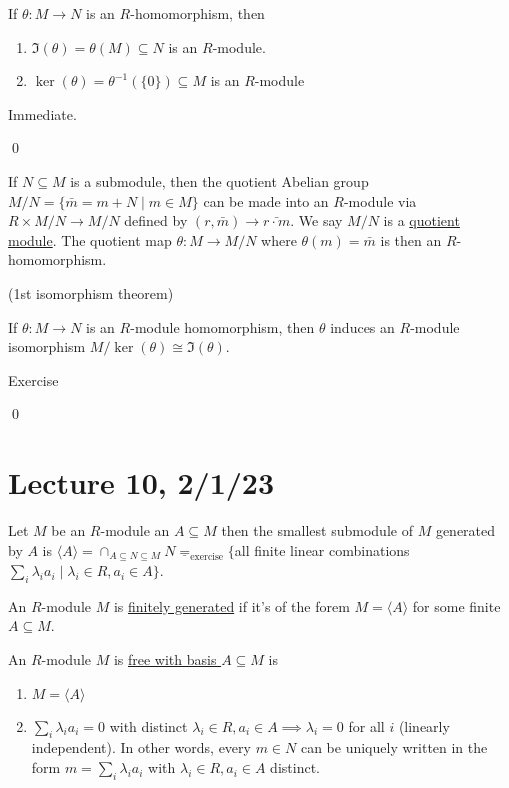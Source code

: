 \documentclass[x11names,reqno,14pt]{extarticle}
\begin{document}
\prop 

If $\theta:M\to N$ is an $R$-homomorphism, then 

\begin{enumerate}

\item $\Im(\theta) = \theta(M)\subseteq N$ is an $R$-module. 

\item $\ker(\theta) = \theta^{-1}(\{0\})\subseteq M$ is an $R$-module

\end{enumerate}

\proof

Immediate. 

\qed

 If $N \subseteq M$ is a submodule, then the quotient Abelian group $M/N = \{\bar{m} = m + N\mid m \in M\}$ can be made into an $R$-module via $R\times M/N\to M/N$ defined by $(r, \bar{m}) \to \bar{r\cdot m}$. We say $M/N$ is a \underline{quotient module}. The quotient map $\theta:M\to M/N$ where $\theta(m) = \bar{m}$ is then an $R$-homomorphism. 

\thm (1st isomorphism theorem)

If $\theta:M\to N$ is an $R$-module homomorphism, then $\theta$ induces an $R$-module isomorphism $M/\ker(\theta) \cong \Im(\theta)$. 

\proof

Exercise

\qed

\section*{Lecture 10, 2/1/23}

 Let $M$ be an $R$-module an $A \subseteq M$ then the smallest submodule of $M$ generated by $A$ is $\langle A \rangle = \cap_{A\subseteq N \subseteq M}N\underline{=}_{\text{exercise}}\{$all finite linear combinations $\sum_i\lambda_ia_i\mid \lambda_i\in R, a_i \in A\}$. 

 An $R$-module $M$ is \underline{finitely generated} if it's of the forem $M = \langle A \rangle$ for some finite $A \subseteq M$. 


An $R$-module $M$ is \underline{free with basis $A\subseteq M$} is 
\begin{enumerate}

\item $M = \langle A \rangle$ 

\item $\sum_i\lambda_ia_i = 0$ with distinct $\lambda_i\in R, a_i \in A \implies \lambda_i=0$ for all $i$ (linearly independent). In other words, every $m \in N$ can be uniquely written in the form $m = \sum_i\lambda_ia_i$ with $\lambda_i\in R, a_i \in A$ distinct. 

\end{enumerate}
\end{document}
